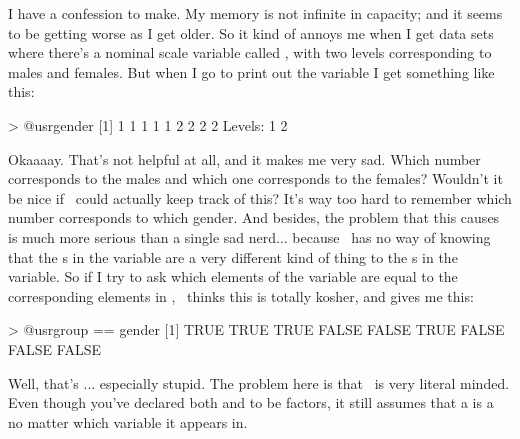 
I have a confession to make. My memory is not infinite in capacity; and it seems to be getting worse as I get older. So it kind of annoys me when I get data sets where there's a nominal scale variable called , with two levels corresponding to males and females. But when I go to print out the variable I get something like this:
\begin{rblock1}
> @usr{gender}
[1] 1 1 1 1 1 2 2 2 2
Levels: 1 2
\end{rblock1}
Okaaaay. That's not helpful at all, and it makes me very sad. Which number corresponds to the males and which one corresponds to the females? Wouldn't it be nice if \R\ could actually keep track of this? It's way too hard to remember which number corresponds to which gender. And besides, the problem that this causes is much more serious than a single sad nerd... because \R\ has no way of knowing that the s in the  variable are a very different kind of thing to the s in the  variable. So if I try to ask which elements of the  variable are equal to the corresponding elements in , \R\ thinks this is totally kosher, and gives me this:
\begin{rblock1}
> @usr{group == gender}
[1]  TRUE  TRUE  TRUE FALSE FALSE  TRUE FALSE FALSE FALSE
\end{rblock1}
Well, that's ... especially stupid.  The problem here is that \R\ is very literal minded. Even though you've declared both  and  to be factors, it still assumes that a  is a  no matter which variable it appears in. 

